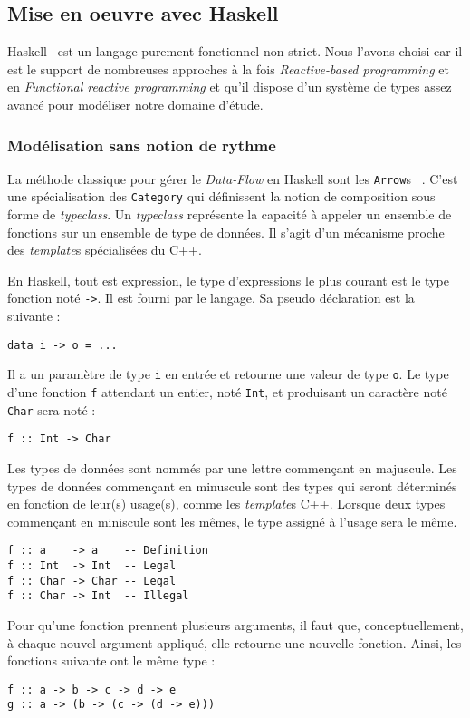 \documentclass{llncs}
\newcommand{\DF}{\emph{Data-Flow} }
\newcommand{\RP}{\emph{Reactive-based programming} }
\newcommand{\FRP}{\emph{Functional reactive programming} }
\newcommand{\Arrs}{\lstinline{Arrow}s }
\begin{document}
\subsection{Mise en oeuvre avec Haskell}
Haskell~\cite{Haskell10} est un langage purement fonctionnel non-strict.
Nous l'avons choisi car il est le support de nombreuses approches à la fois \RP
et en \FRP et qu'il dispose d'un système de types assez avancé pour modéliser
notre domaine d'étude.

\subsubsection{Modélisation sans notion de rythme}
La méthode classique pour gérer le \DF en Haskell sont les \Arrs~\cite{Hughes00}.
C'est une spécialisation des \lstinline{Category}
qui définissent la notion de composition sous forme de \emph{typeclass}.
Un \emph{typeclass} représente la capacité à appeler un ensemble
de fonctions sur un ensemble de type de données.
Il s'agit d'un mécanisme proche des \emph{template}s spécialisées du C++.

En Haskell, tout est expression, le type d'expressions le plus courant est le type
fonction noté \lstinline{->}.
Il est fourni par le langage.
Sa pseudo déclaration est la suivante :
\begin{lstlisting}
data i -> o = ...
\end{lstlisting}
Il a un paramètre de type \lstinline{i} en entrée et retourne une
valeur de type \lstinline{o}.
Le type d'une fonction \lstinline{f} attendant un entier, noté \lstinline{Int}, et
produisant un caractère noté \lstinline{Char} sera noté :
\begin{lstlisting}
f :: Int -> Char
\end{lstlisting}

Les types de données sont nommés par une lettre commençant en majuscule.
Les types de données commençant en minuscule sont des types qui seront déterminés
en fonction de leur(s) usage(s), comme les \emph{template}s C++.
Lorsque deux types commençant en miniscule sont les mêmes, le type assigné à
l'usage sera le même.
\begin{lstlisting}
f :: a    -> a    -- Definition
f :: Int  -> Int  -- Legal
f :: Char -> Char -- Legal
f :: Char -> Int  -- Illegal
\end{lstlisting}

Pour qu'une fonction prennent plusieurs arguments, il faut que, conceptuellement,
à chaque nouvel argument appliqué, elle retourne une nouvelle fonction.
Ainsi, les fonctions suivante ont le même type :
\begin{lstlisting}
f :: a -> b -> c -> d -> e
g :: a -> (b -> (c -> (d -> e)))
\end{lstlisting}
\end{document}
